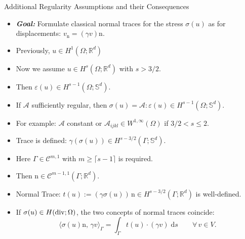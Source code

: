 \documentclass[10pt,aspectratio=169]{beamer}
\def\R{{\mathbb R}}
\def\S{{\mathbb S}}
\def\cA{{\mathcal A}}
\def\cC{{\mathcal C}}
\def\d{{\mathrm{d}}}
\def\ds{{\d s}}
\newcommand{\diver}{\operatornamewithlimits{div}}
\begin{document}
\begin{frame}{Additional Regularity Assumptions and their Consequences}
	\begin{itemize}
		\item \textbf{\em Goal:} Formulate classical normal traces for the stress $\sigma(u)$ as for displacements: $v_\mathrm{n} = (\gamma v)\mathrm{n}$.
		\item Previously, $u\in H^1(\Omega;\R^d)$
		\item Now we assume $u\in H^s(\Omega;\R^d)$ with $s>3/2$.
		\item Then $\varepsilon(u)\in H^{s-1}(\Omega;\S^d)$.
		\item If $\cA$ sufficiently regular, then $\sigma(u) = \cA:\varepsilon(u)\in H^{s-1}(\Omega;\S^d)$.
		\item For example: $\cA$ constant or $\cA_{ijkl}\in W^{1,\infty}(\Omega)$ if $3/2<s\le 2$.
		\item Trace is defined: $\gamma(\sigma(u))\in H^{s-3/2}(\Gamma;\S^d)$.
		\item Here $\Gamma\in\cC^{m,1}$ with $m\ge\lceil s-1\rceil$ is required.
		\item Then $\mathrm{n}\in \cC^{m-1,1}(\Gamma;\R^d)$.
		\item Normal Trace: $t(u):=(\gamma \sigma(u))\,\mathrm{n}\in H^{s-3/2}(\Gamma;\R^d)$ is well-defined.
		\item If $\sigma(u)\in H(\diver;\Omega)$, the two concepts of normal traces coincide:
		      \begin{equation*}
			      \langle \sigma(u)\mathrm{n},\, \gamma v\rangle_\Gamma  = \int_\Gamma t(u)\cdot (\gamma v)\;\ds\qquad \forall\, v\in V.
		      \end{equation*}
	\end{itemize}
\end{frame}
\end{document}

